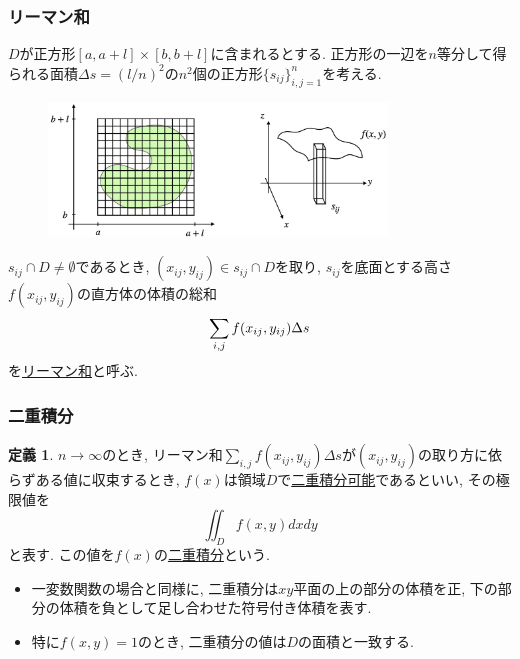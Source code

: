 \documentclass[dvipdfmx,cjk,10.2pt]{beamer}
\theoremstyle{definition}
\newtheorem{Def}[Thm]{定義}
\begin{document}


\begin{frame}
\frametitle{リーマン和}

\vspace{-2mm}
$D$が正方形$[a,a+l]\times [b,b+l]$に含まれるとする. 
正方形の一辺を$n$等分して得られる面積$\Delta s=(l/n)^2$の$n^2$個の正方形$\{s_{ij}\}_{i,j=1}^n$を考える. 

\vspace{-4mm}
\begin{figure}[htbp]
 \begin{center} 
  \includegraphics[width=90mm]{div_domain2.png}
 \end{center}
\end{figure}
\vspace{-3mm}

$s_{ij} \cap D \ne \emptyset$であるとき, $(x_{ij},y_{ij})\in s_{ij} \cap D$を取り, $s_{ij}$を底面とする高さ$f(x_{ij},y_{ij})$の直方体の体積の総和 \vspace{-1mm}
$$
\sum_{i,j }f(x_{ij},y_{ij})\Delta s \vspace{-4mm}
$$
を\underline{リーマン和}と呼ぶ. 

\end{frame}






\begin{frame}
\frametitle{二重積分}


\begin{Def}
$n \to \infty$のとき, リーマン和$\sum_{i,j }f(x_{ij},y_{ij})\Delta s$が$(x_{ij},y_{ij})$の取り方に依らずある値に収束するとき, 
$f(x)$は領域$D$で\underline{二重積分可能}であるといい, その極限値を
$$
\iint_D f(x,y)dxdy
$$
と表す. この値を$f(x)$の\underline{二重積分}という. 
\end{Def}

\begin{itemize}
\item 一変数関数の場合と同様に, 二重積分は$xy$平面の上の部分の体積を正, 下の部分の体積を負として足し合わせた符号付き体積を表す. 
\item 特に$f(x ,y)=1$のとき, 二重積分の値は$D$の面積と一致する. 
\end{itemize}

\end{frame}
\end{document}
